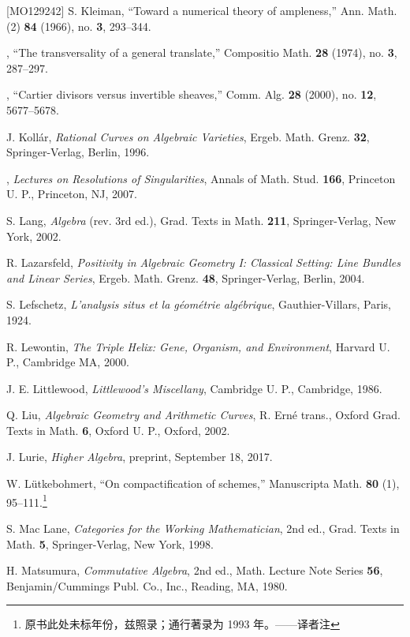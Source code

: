 \begin{thebibliography}{[MO129242]}
S. Kleiman, ``Toward a numerical theory of ampleness,'' Ann. Math. (2)
\textbf{84} (1966), no. \textbf{3}, 293--344.

\sameauthor, ``The transversality of a general translate,'' Compositio Math.
\textbf{28} (1974), no. \textbf{3}, 287--297.

\sameauthor, ``Cartier divisors versus invertible sheaves,'' Comm. Alg.
\textbf{28} (2000), no. \textbf{12}, 5677--5678.

J. Kollár, \emph{Rational Curves on Algebraic Varieties}, Ergeb. Math. Grenz.
\textbf{32}, Springer-Verlag, Berlin, 1996.

\sameauthor, \emph{Lectures on Resolutions of Singularities}, Annals of Math.
Stud. \textbf{166}, Princeton U. P., Princeton, NJ, 2007.

S. Lang, \emph{Algebra} (rev. 3rd ed.), Grad. Texts in Math. \textbf{211},
Springer-Verlag, New York, 2002.

R. Lazarsfeld, \emph{Positivity in Algebraic Geometry I: Classical Setting:
Line Bundles and Linear Series}, Ergeb. Math. Grenz. \textbf{48},
Springer-Verlag, Berlin, 2004.

S. Lefschetz, \emph{L'analysis situs et la géométrie algébrique},
Gauthier-Villars, Paris, 1924.

R. Lewontin, \emph{The Triple Helix: Gene, Organism, and Environment}, Harvard
U. P., Cambridge MA, 2000.

J. E. Littlewood, \emph{Littlewood's Miscellany}, Cambridge U. P., Cambridge,
1986.

Q. Liu, \emph{Algebraic Geometry and Arithmetic Curves}, R. Erné trans.,
Oxford Grad. Texts in Math. \textbf{6}, Oxford U. P., Oxford, 2002.

J. Lurie, \emph{Higher Algebra}, preprint, September 18, 2017.

W. Lütkebohmert, ``On compactification of schemes,'' Manuscripta Math.
\textbf{80} (1), 95--111.\footnote{原书此处未标年份，兹照录；通行著录为 1993
年。——译者注}

S. Mac Lane, \emph{Categories for the Working Mathematician}, 2nd ed., Grad.
Texts in Math. \textbf{5}, Springer-Verlag, New York, 1998.

H. Matsumura, \emph{Commutative Algebra}, 2nd ed., Math. Lecture Note Series
\textbf{56}, Benjamin/Cummings Publ. Co., Inc., Reading, MA, 1980.


\end{thebibliography}
